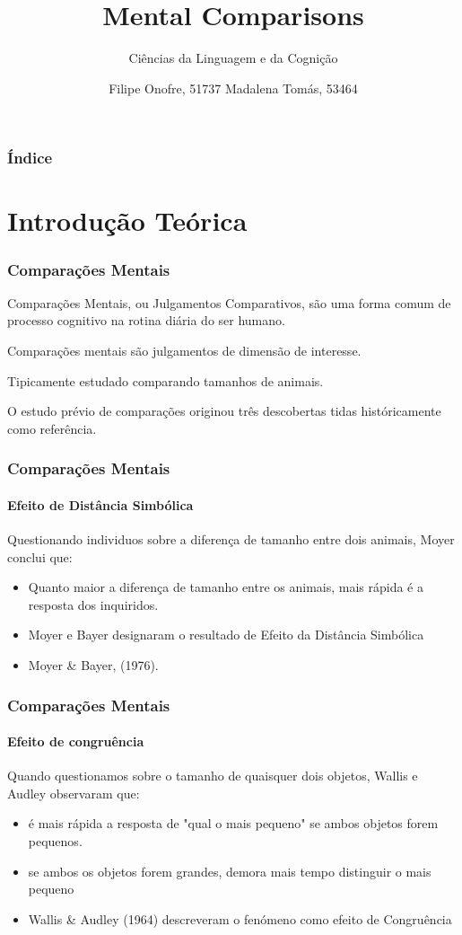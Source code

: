 \documentclass{beamer}
\title{Mental Comparisons}
\subtitle{Ciências da Linguagem e da Cognição}
\author{Filipe Onofre, 51737 \linebreak Madalena Tomás, 53464}
\begin{document}
\begin{frame}
	\titlepage
\end{frame}
\begin{frame}
	\frametitle{Índice}
	\tableofcontents
\end{frame}

\section{Introdução Teórica}

\begin{frame}
	\frametitle{Comparações Mentais}
	\begin{description}
		\item Comparações Mentais, ou Julgamentos Comparativos, são uma forma comum de processo cognitivo na rotina diária do ser humano.
		\item Comparações mentais são julgamentos de dimensão de interesse.
		\item Tipicamente estudado comparando tamanhos de animais.
		\item O estudo prévio de comparações originou três descobertas tidas históricamente como referência. 
	\end{description}
\end{frame}
\begin{frame}
	\frametitle{Comparações Mentais}
	\framesubtitle{Efeito de Distância Simbólica}
	Questionando individuos sobre a diferença de tamanho entre dois animais, Moyer conclui que:
	\begin{itemize}
	\item Quanto maior a diferença de tamanho entre os animais, mais rápida é a resposta dos inquiridos.
	\item 	Moyer e Bayer designaram o resultado de Efeito da Distância Simbólica
	\item Moyer \& Bayer, (1976).
	\end{itemize}
\end{frame}
\begin{frame}
	\frametitle{Comparações Mentais}
	\framesubtitle{Efeito de congruência}
	
	Quando questionamos sobre o tamanho de quaisquer dois objetos, Wallis e Audley observaram que:
	
	\begin{itemize}
	\item é mais rápida a resposta de "qual o mais pequeno" se ambos objetos forem pequenos.
	
	\item se ambos os objetos forem grandes, demora mais tempo distinguir o mais pequeno
	
	\item Wallis \& Audley (1964) descreveram o fenómeno como efeito de Congruência
	\end{itemize}
\end{frame}
\end{document}
